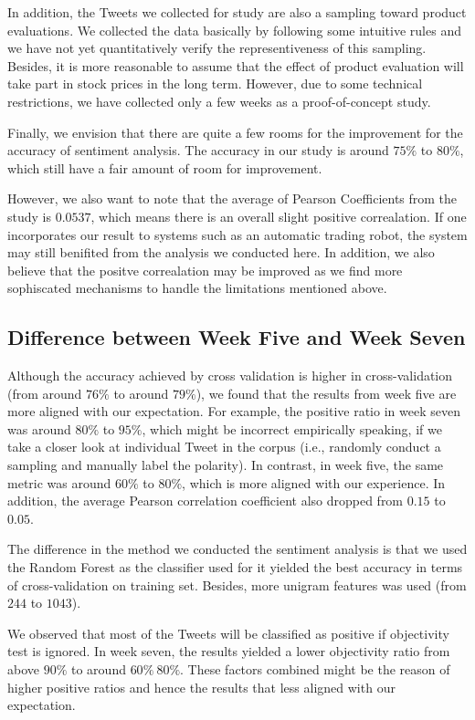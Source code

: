\documentclass[12pt]{article}
\begin{document}
In addition, the Tweets we collected for study are also a sampling toward product evaluations. We collected the data basically by following some intuitive rules and we have not yet quantitatively verify the representiveness of this sampling. Besides, it is more reasonable to assume that the effect of product evaluation will take part in stock prices in the long term. However, due to some technical restrictions, we have collected only a few weeks as a proof-of-concept study.

Finally, we envision that there are quite a few rooms for the improvement for the accuracy of sentiment analysis. The accuracy in our study is around $75\%$ to $80\%$, which still have a fair amount of room for improvement.

However, we also want to note that the average of Pearson Coefficients from the study is $0.0537$, which means there is an overall slight positive correalation. If one incorporates our result to systems such as an automatic trading robot, the system may still benifited from the analysis we conducted here. In addition, we also believe that the positve correalation may be improved as we find more sophiscated mechanisms to handle the limitations mentioned above.

\subsection{Difference between Week Five and Week Seven}

Although the accuracy achieved by cross validation is higher in cross-validation (from around $76\%$ to around $79\%$), we found that the results from week five are more aligned with our expectation. For example, the positive ratio in week seven was around $80\%$ to $95\%$, which might be incorrect empirically speaking, if we take a closer look at individual Tweet in the corpus (i.e., randomly conduct a sampling and manually label the polarity). In contrast, in week five, the same metric was around $60\%$ to $80\%$, which is more aligned with our experience. In addition, the average Pearson correlation coefficient also dropped from $0.15$ to $0.05$.

The difference in the method we conducted the sentiment analysis is that we used the Random Forest as the classifier used for it yielded the best accuracy in terms of cross-validation on training set. Besides, more unigram features was used (from $244$ to $1043$). 

We observed that most of the Tweets will be classified as positive if objectivity test is ignored. In week seven, the results yielded a lower objectivity ratio from above $90\%$ to around $60\% ~ 80\%$. These factors combined might be the reason of higher positive ratios and hence the results that less aligned with our expectation.
\end{document}
